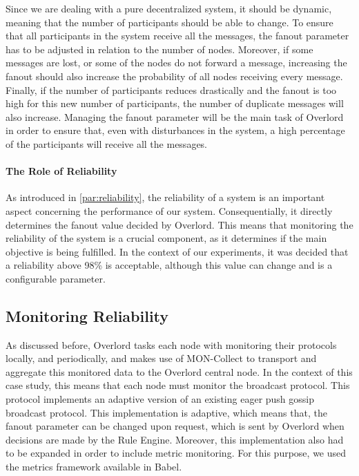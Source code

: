Since we are dealing with a pure decentralized system, it should be dynamic, meaning that the number of participants should be able to change. To ensure that all participants in the system receive all the messages, the fanout parameter has to be adjusted in relation to the number of nodes. Moreover, if some messages are lost, or some of the nodes do not forward a message, increasing the fanout should also increase the probability of all nodes receiving every message. Finally, if the number of participants reduces drastically and the fanout is too high for this new number of participants, the number of duplicate messages will also increase. Managing the fanout parameter will be the main task of Overlord in order to ensure that, even with disturbances in the system, a high percentage of the participants will receive all the messages.

\paragraph{The Role of Reliability} \label{par:the_role_of_reliability} As introduced in \ref{par:reliability}, the reliability of a system is an important aspect concerning the performance of our system. Consequentially, it directly determines the fanout value decided by Overlord. This means that monitoring the reliability of the system is a crucial component, as it determines if the main objective is being fulfilled. In the context of our experiments, it was decided that a reliability above 98\% is acceptable, although this value can change and is a configurable parameter.

\subsection{Monitoring Reliability}
\label{ssec:monitoring_reliability}
As discussed before, Overlord tasks each node with monitoring their protocols locally, and periodically, and makes use of MON-Collect to transport and aggregate this monitored data to the Overlord central node. In the context of this case study, this means that each node must monitor the broadcast protocol. This protocol implements an adaptive version of an existing eager push gossip broadcast protocol\cite{Leitao2010a}. This implementation is adaptive, which means that, the fanout parameter can be changed upon request, which is sent by Overlord when decisions are made by the Rule Engine. Moreover, this implementation also had to be expanded in order to include metric monitoring. For this purpose, we used the metrics framework available in Babel\cite{Paulico2025}.

